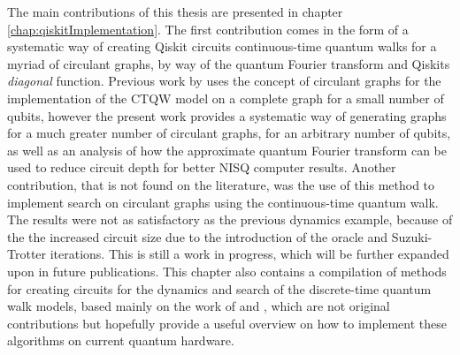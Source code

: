 \documentclass[../../dissertation.tex]{subfiles}
\begin{document}
The main contributions of this thesis are presented in chapter
\ref{chap:qiskitImplementation}. The first contribution comes in the form
of a systematic way of creating Qiskit circuits continuous-time quantum walks
for a myriad of circulant graphs, by way of the quantum Fourier transform and
Qiskits \textit{diagonal} function. Previous work by \cite{qiang2016} uses
the concept of circulant graphs for the implementation of the CTQW model on a
complete graph for a small number of qubits, however the present work provides
a systematic way of generating graphs for a much greater number of circulant
graphs, for an arbitrary number of qubits, as well as an analysis of how the
approximate quantum Fourier transform can be used to reduce circuit depth for
better NISQ computer results. Another contribution, that is not found on the
literature, was the use of this method to implement search on circulant graphs
using the continuous-time quantum walk.  The results were not as satisfactory
as the previous dynamics example, because of the the increased circuit size due
to the introduction of the oracle and Suzuki-Trotter iterations. This is still
a work in progress, which will be further expanded upon in future publications.
This chapter also contains a compilation of methods for creating circuits for
the dynamics and search of the discrete-time quantum walk models, based mainly
on the work of \cite{douglaswang07} and \cite{acasiete2020}, which are not
original contributions but hopefully provide a useful overview on how to
implement these algorithms on current quantum hardware.  
\end{document}
